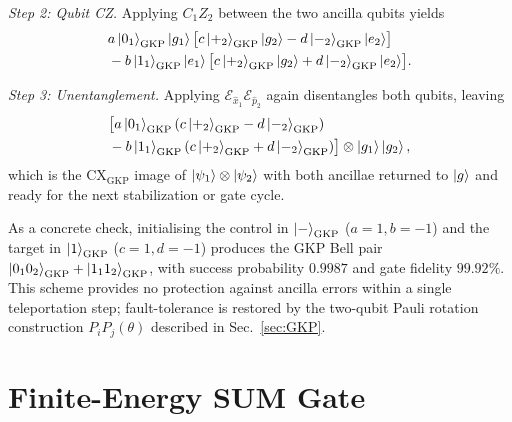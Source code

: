 \documentclass[aps,prx,showpacs,notitlepage,twocolumn,superscriptaddress,nofootinbib,preprintnumbers,floatfix,10pt, longbibliography]{revtex4-2}
\begin{document}
{\textit{Step 2: Qubit CZ.}
Applying $C_1Z_2$ between the two ancilla qubits yields
\begin{align}
  &a\ket{0_1}_\mathrm{GKP}\ket{g_1}
   \bigl[c\ket{+_2}_\mathrm{GKP}\ket{g_2}
         -d\ket{-_2}_\mathrm{GKP}\ket{e_2}\bigr]
  \nonumber\\
  &-b\ket{1_1}_\mathrm{GKP}\ket{e_1}
   \bigl[c\ket{+_2}_\mathrm{GKP}\ket{g_2}
         +d\ket{-_2}_\mathrm{GKP}\ket{e_2}\bigr].
\end{align}

\textit{Step 3: Unentanglement.}
Applying $\mathcal{E}_{\hat{x}_1}\mathcal{E}_{\hat{p}_2}$ again
disentangles both qubits, leaving
\begin{align}
  &\bigl[a\ket{0_1}_\mathrm{GKP}(c\ket{+_2}_\mathrm{GKP}
         -d\ket{-_2}_\mathrm{GKP})
  \nonumber\\
  &-b\ket{1_1}_\mathrm{GKP}(c\ket{+_2}_\mathrm{GKP}
    +d\ket{-_2}_\mathrm{GKP})\bigr]
   \otimes\ket{g_1}\ket{g_2},
\end{align}
which is the $\mathrm{CX}_\mathrm{GKP}$ image of
$\ket{\psi_1}\otimes\ket{\psi_2}$ with both ancillae returned to $\ket{g}$
and ready for the next stabilization or gate cycle.

As a concrete check, initialising the control in
$\ket{-}_\mathrm{GKP}$ ($a=1,b=-1$) and the target in
$\ket{1}_\mathrm{GKP}$ ($c=1,d=-1$) produces the GKP Bell pair
$\ket{0_10_2}_\mathrm{GKP}+\ket{1_11_2}_\mathrm{GKP}$, with success
probability $0.9987$ and gate fidelity $99.92\%$.  This scheme provides no
protection against ancilla errors within a single teleportation step;
fault-tolerance is restored by the two-qubit Pauli rotation construction
$P_iP_j(\theta)$ described in Sec.~\ref{sec:GKP}.

\section{Finite-Energy SUM Gate}\label{app:finite-SUM}

}
\end{document}
